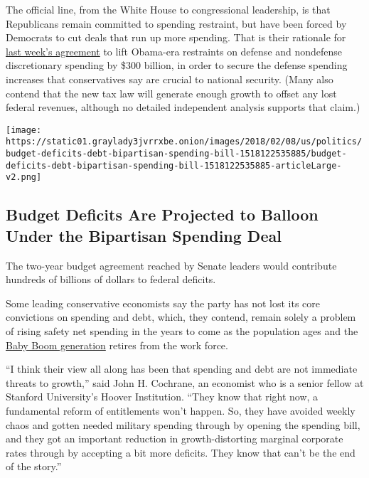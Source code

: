 The official line, from the White House to congressional leadership, is
that Republicans remain committed to spending restraint, but have been
forced by Democrats to cut deals that run up more spending. That is
their rationale for
\href{https://www.nytimes3xbfgragh.onion/2018/02/08/us/politics/congress-budget-deal-vote.html}{last
week's agreement} to lift Obama-era restraints on defense and nondefense
discretionary spending by \$300 billion, in order to secure the defense
spending increases that conservatives say are crucial to national
security. (Many also contend that the new tax law will generate enough
growth to offset any lost federal revenues, although no detailed
independent analysis supports that claim.)

\href{https://www.nytimes3xbfgragh.onion/interactive/2018/02/08/us/politics/budget-deficits-debt-bipartisan-spending-bill.html}{}

\texttt{[image: https://static01.graylady3jvrrxbe.onion/images/2018/02/08/us/politics/budget-deficits-debt-bipartisan-spending-bill-1518122535885/budget-deficits-debt-bipartisan-spending-bill-1518122535885-articleLarge-v2.png]}

\hypertarget{budget-deficits-are-projected-to-balloon-under-the-bipartisan-spending-deal}{%
\subsection{Budget Deficits Are Projected to Balloon Under the
Bipartisan Spending
Deal}\label{budget-deficits-are-projected-to-balloon-under-the-bipartisan-spending-deal}}

The two-year budget agreement reached by Senate leaders would contribute
hundreds of billions of dollars to federal deficits.

Some leading conservative economists say the party has not lost its core
convictions on spending and debt, which, they contend, remain solely a
problem of rising safety net spending in the years to come as the
population ages and the
\href{https://www.washingtonpost.com/posteverything/wp/2015/11/05/baby-boomers-are-whats-wrong-with-americas-economy/?utm_term=.bc489318a19c}{Baby
Boom generation} retires from the work force.

``I think their view all along has been that spending and debt are not
immediate threats to growth,'' said John H. Cochrane, an economist who
is a senior fellow at Stanford University's Hoover Institution. ``They
know that right now, a fundamental reform of entitlements won't happen.
So, they have avoided weekly chaos and gotten needed military spending
through by opening the spending bill, and they got an important
reduction in growth-distorting marginal corporate rates through by
accepting a bit more deficits. They know that can't be the end of the
story.''

